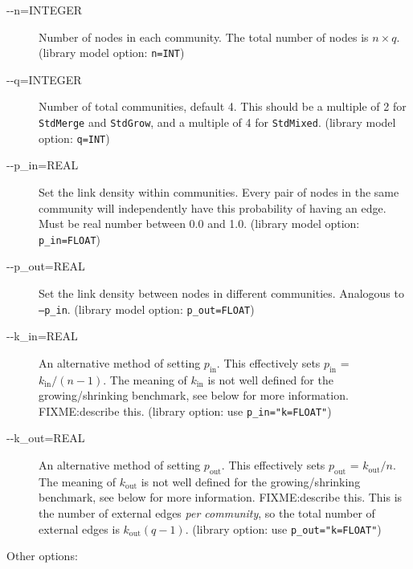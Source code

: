 \documentclass{article}
\def\pin{p_\mathrm{in}}
\def\pout{p_\mathrm{out}}
\def\kin{k_\mathrm{in}}
\def\kout{k_\mathrm{out}}
\def\code#1{\texttt{#1}}
\begin{document}
\begin{description}
\item[-{}-n=INTEGER] Number of nodes in each community.  The total
  number of nodes is $n\times q$.  (library model option: \code{n=INT})
\item[-{}-q=INTEGER] Number of total communities, default 4.  This
  should be a multiple of 2 for \texttt{StdMerge} and
  \texttt{StdGrow}, and a multiple of 4 for \texttt{StdMixed}.
  (library model option: \code{q=INT})
\item[-{}-p\_in=REAL] Set the link density within communities.  Every
  pair of nodes in the same community will independently have this
  probability of having an edge.  Must be real number between 0.0 and
  1.0.  (library model option: \code{p\_in=FLOAT})
\item[-{}-p\_out=REAL] Set the link density between nodes in different
  communities.  Analogous to \code{--p\_in}.  (library model option:
  \code{p\_out=FLOAT})
\item[-{}-k\_in=REAL] An alternative method of setting $\pin$.  This
  effectively sets $\pin$ = $\kin/(n-1)$.  The meaning of $\kin$ is
  not well defined for the growing/shrinking benchmark, see below for
  more information.  FIXME:describe this. (library option: use
  \code{p\_in="k=FLOAT"})
\item[-{}-k\_out=REAL] An alternative method of setting $\pout$.  This
  effectively sets $\pout$ = $\kout/n$.  The meaning of $\kout$ is not
  well defined for the growing/shrinking benchmark, see below for more
  information.  FIXME:describe this. This is the number of external
  edges \textsl{per community}, so the total number of external edges
  is $\kout(q-1)$.  (library option: use \code{p\_out="k=FLOAT"})
\end{description}

\vspace{.5cm}

\noindent
Other options:
\end{document}
